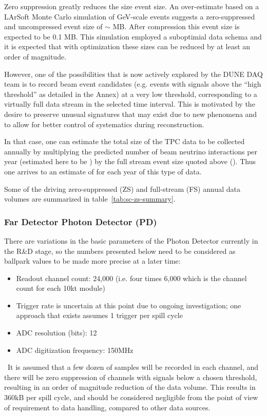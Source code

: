 Zero suppression greatly reduces the size event size.  An
over-estimate based on a LArSoft Monte Carlo simulation of GeV-scale
events suggests a zero-suppressed and uncompressed event size of $\sim$\beameventsize
MB.  After compression this event size is expected to be 0.1 MB.  This
simulation employed a suboptimial data schema and it is expected that
with optimization these sizes can be reduced by at least an order of
magnitude.

However, one of the possibilities that is now actively explored by the DUNE
DAQ team is to record beam event candidates (e.g. events with signals
above the ``high threshold'' as detailed in the Annex) at a very low threshold, corresponding
to a virtually full data stream in the selected time interval. This is motivated
by the desire to preserve unusual signatures that may exist due to new
phenomena and to allow for better control of systematics during reconstruction.

In that case, one can estimate the total size of the TPC data
to be collected annually by multiplying the predicted number of beam neutrino interactions
per year (estimated here to be \beamrate) by the full stream event size
quoted above (\dunefsreadoutsize).  Thus one arrives to an estimate of
\beamdatayearfs for each year of this type of data.

Some of the driving zero-suppressed (ZS) and full-stream (FS) annual
data volumes are summarized in table~\ref{tab:sc-zs-summary}.




\subsubsection{Far Detector Photon Detector (PD)}
There are variations in the basic parameters of the Photon Detector currently in the R\&D stage,
so the numbers presented below need to be considered as ballpark values to be made more precise
at a later time:

\begin{itemize}
\item Readout channel count: 24,000 (i.e. four times 6,000 which is the channel count for each 10kt module)
\item Trigger rate is uncertain at this point due to ongoing investigation; one approach that exists assumes 1 trigger per spill cycle
\item ADC resolution (bits): 12
\item ADC digitization frequency: 150MHz
\end{itemize}
\
It is assumed that a few dozen of samples will be recorded in each channel, and there will
be zero suppression of channels with signals below a chosen threshold, resulting in an order
of magnitude reduction of the data volume.
This results in 360kB per spill cycle, and should be considered negligible from the point of view of requirement to data handling, compared to other data sources.

